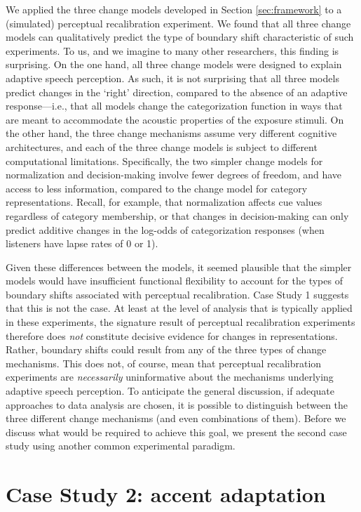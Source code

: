 \documentclass[
  11pt,
  man,floatsintext]{apa6}
\begin{document}
We applied the three change models developed in Section \ref{sec:framework} to a (simulated) perceptual recalibration experiment. We found that all three change models can qualitatively predict the type of boundary shift characteristic of such experiments. To us, and we imagine to many other researchers, this finding is surprising. On the one hand, all three change models were designed to explain adaptive speech perception. As such, it is not surprising that all three models predict changes in the `right' direction, compared to the absence of an adaptive response---i.e., that all models change the categorization function in ways that are meant to accommodate the acoustic properties of the exposure stimuli. On the other hand, the three change mechanisms assume very different cognitive architectures, and each of the three change models is subject to different computational limitations. Specifically, the two simpler change models for normalization and decision-making involve fewer degrees of freedom, and have access to less information, compared to the change model for category representations. Recall, for example, that normalization affects cue values regardless of category membership, or that changes in decision-making can only predict additive changes in the log-odds of categorization responses (when listeners have lapse rates of 0 or 1).

Given these differences between the models, it seemed plausible that the simpler models would have insufficient functional flexibility to account for the types of boundary shifts associated with perceptual recalibration. Case Study 1 suggests that this is not the case. At least at the level of analysis that is typically applied in these experiments, the signature result of perceptual recalibration experiments therefore does \emph{not} constitute decisive evidence for changes in representations. Rather, boundary shifts could result from any of the three types of change mechanisms. This does not, of course, mean that perceptual recalibration experiments are \emph{necessarily} uninformative about the mechanisms underlying adaptive speech perception. To anticipate the general discussion, if adequate approaches to data analysis are chosen, it is possible to distinguish between the three different change mechanisms (and even combinations of them). Before we discuss what would be required to achieve this goal, we present the second case study using another common experimental paradigm.

\hypertarget{sec:AA}{%
\section{Case Study 2: accent adaptation}\label{sec:AA}}
\end{document}
